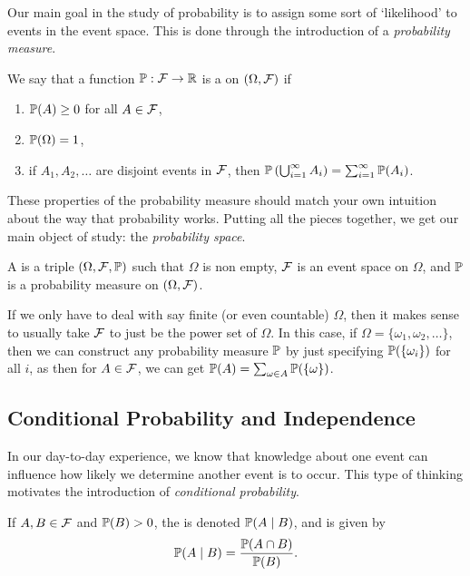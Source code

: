 \documentclass[10pt, a4paper]{article}
\begin{document}
Our main goal in the study of probability is to assign some sort of `likelihood' to events in the event space. This is done through the introduction of a \emph{probability measure}.


\begin{definition}
	We say that a function $\mathbb{P} : \mathcal{F} \rightarrow \mathbb{R}$ is a  on $(\Omega, \mathcal{F})$ if
	\begin{enumerate}
		\item $\mathbb{P}(A) \geq 0$ for all $A \in \mathcal{F}$,
		\item $\mathbb{P}(\Omega) = 1$,
		\item if $A_1, A_2, \dots$ are disjoint events in $\mathcal{F}$, then $\mathbb{P}\left(\bigcup_{i = 1}^{\infty} A_i\right) = \sum_{i = 1}^{\infty} \mathbb{P}(A_i)$.
	\end{enumerate} 
\end{definition}

These properties of the probability measure should match your own intuition about the way that probability works. Putting all the pieces together, we get our main object of study: the \emph{probability space}.

\begin{definition}
	A  is a triple $(\Omega, \mathcal{F}, \mathbb{P})$ such that $\Omega$ is non empty, $\mathcal{F}$ is an event space on $\Omega$, and $\mathbb{P}$ is a probability measure on $(\Omega, \mathcal{F})$.
\end{definition}


If we only have to deal with say finite (or even countable) $\Omega$, then it makes sense to usually take $\mathcal{F}$ to just be the power set of $\Omega$. In this case, if $\Omega = \{\omega_1, \omega_2, \dots \}$, then we can construct any probability measure $\mathbb{P}$ by just specifying $\mathbb{P}(\{\omega_i\})$ for all $i$, as then for $A \in \mathcal{F}$, we can get $\mathbb{P}(A) = \sum_{\omega \in A} \mathbb{P}(\{\omega\})$. 

\subsection{Conditional Probability and Independence}

In our day-to-day experience, we know that knowledge about one event can influence how likely we determine another event is to occur. This type of thinking motivates the introduction of \emph{conditional probability}.

\begin{definition}
	If $A, B \in \mathcal{F}$ and $\mathbb{P}(B) > 0$, the  is denoted $\mathbb{P}(A \mid B)$, and is given by
	$$
	\mathbb{P}(A \mid B) = \frac{\mathbb{P}(A \cap B)}{\mathbb{P}(B)}.
	$$
\end{definition}
\end{document}
